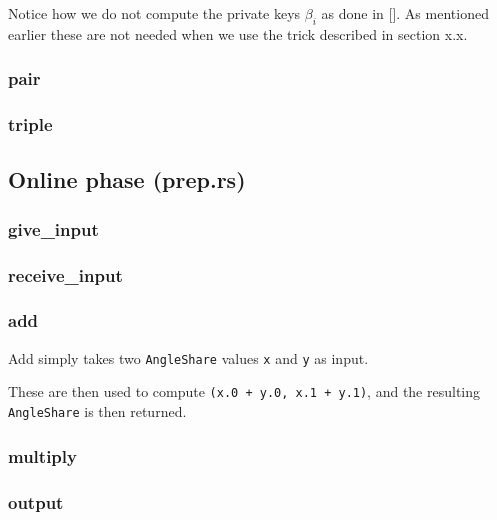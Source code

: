 \documentclass{article}
\begin{document}
Notice how we do not compute the private keys $\beta_i$ as done in []. As mentioned earlier these are not needed when we use the trick described in section x.x.
\subsubsection{pair}
\subsubsection{triple}

\subsection{Online phase (prep.rs)}
\subsubsection{give\_input}
\subsubsection{receive\_input}
\subsubsection{add}
Add simply takes two \lstinline{AngleShare} values \lstinline{x} and \lstinline{y} as input.

These are then used to compute \lstinline{(x.0 + y.0, x.1 + y.1)}, and the resulting \lstinline{AngleShare} is then returned.
\subsubsection{multiply}
\subsubsection{output}
\end{document}
